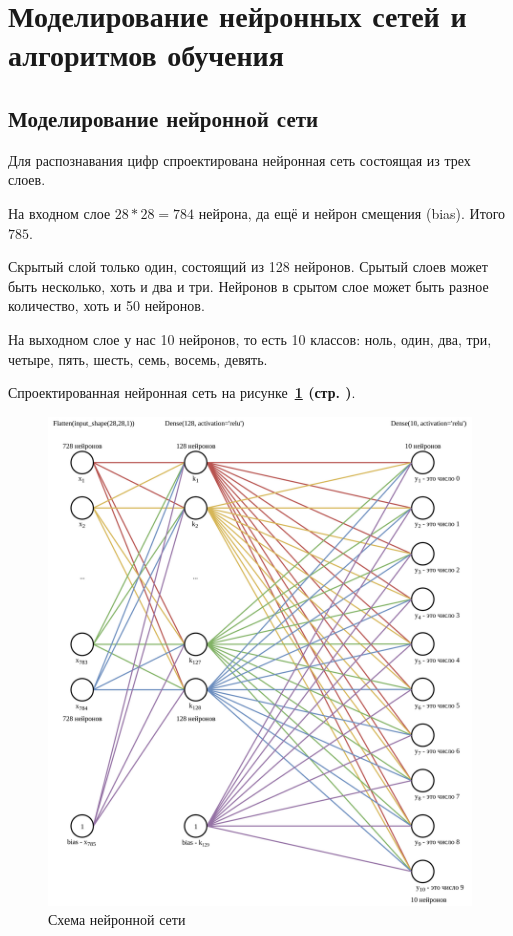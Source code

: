\section{Моделирование нейронных сетей и алгоритмов обучения}

\subsection{Моделирование нейронной сети}

Для распознавания цифр спроектирована нейронная сеть состоящая из трех слоев.

На входном слое $28 * 28 = 784$ нейрона, да ещё и нейрон смещения (bias). Итого $785$.

Скрытый слой только один, состоящий из 128 нейронов. Срытый слоев может быть несколько, хоть и два и три. Нейронов в срытом слое может быть разное количество, хоть и 50 нейронов.

На выходном слое у нас 10 нейронов, то есть 10 классов: ноль, один, два, три, четыре, пять, шесть, семь, восемь, девять.

Спроектированная нейронная сеть на
рисунке~\textbf{\ref{fig:3_NNDiagram} (стр. \pageref{fig:3_NNDiagram})}.

\begin{figure}[p]
    \centering
    \includegraphics[width=16cm]
    {../../src/digits/NNDiagram.png}
    \caption{Схема нейронной сети}
    \label{fig:3_NNDiagram}
\end{figure}

